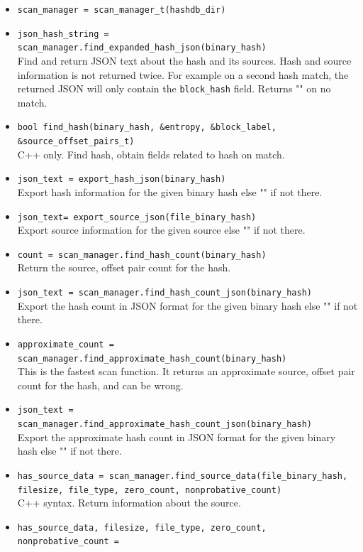 \documentclass[11pt,fleqn]{article} %
\begin{document}
\begin{itemize}
\item \verb+scan_manager = scan_manager_t(hashdb_dir)+
\item \verb+json_hash_string = scan_manager.find_expanded_hash_json(binary_hash)+\\
Find and return JSON text about the hash and its sources. Hash and source information is not returned twice. For example on a second hash match, the returned JSON will only contain the \verb+block_hash+ field. Returns "" on no match.
\item \verb+bool find_hash(binary_hash, &entropy, &block_label, &source_offset_pairs_t)+\\
C++ only. Find hash, obtain fields related to hash on match.
\item \verb+json_text = export_hash_json(binary_hash)+\\
Export hash information for the given binary hash else "" if not there.
\item \verb+json_text= export_source_json(file_binary_hash)+\\
Export source information for the given source else "" if not there.
\item \verb+count = scan_manager.find_hash_count(binary_hash)+\\
Return the source, offset pair count for the hash.
\item \verb+json_text = scan_manager.find_hash_count_json(binary_hash)+\\
Export the hash count in JSON format for the given binary hash else "" if not there.
\item \verb+approximate_count = scan_manager.find_approximate_hash_count(binary_hash)+\\
This is the fastest scan function. It returns an approximate source, offset pair count for the hash, and can be wrong.
\item \verb+json_text = scan_manager.find_approximate_hash_count_json(binary_hash)+\\
Export the approximate hash count in JSON format for the given binary hash else "" if not there.
\item \verb+has_source_data = scan_manager.find_source_data(file_binary_hash,+\\
\verb+filesize, file_type, zero_count, nonprobative_count)+\\
C++ syntax. Return information about the source.
\item \verb+has_source_data, filesize, file_type, zero_count, nonprobative_count =+\\

\end{itemize}
\end{document}
